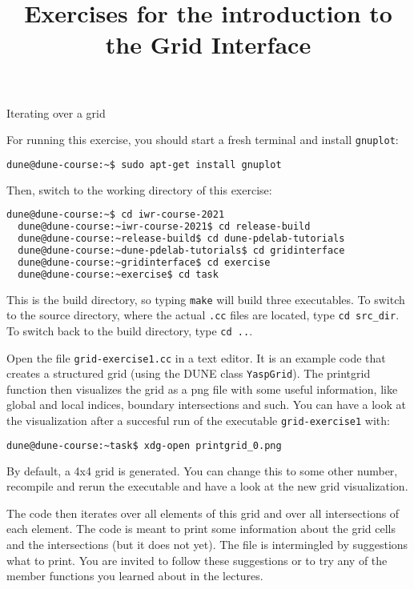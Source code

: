 \documentclass[12pt,a4paper]{article}
\title{\textbf{Exercises for the introduction to the Grid Interface}}
\begin{document}
\exerciseheader

\begin{Exercise}{Iterating over a grid}

For running this exercise, you should start a fresh terminal and install \texttt{gnuplot}:
\begin{lstlisting}[language=bash,keywordstyle=\color{blue}]
  dune@dune-course:~$ sudo apt-get install gnuplot
\end{lstlisting}

Then, switch to the working directory of this exercise:
\begin{lstlisting}[language=bash,keywordstyle=\color{blue}]
  dune@dune-course:~$ cd iwr-course-2021
  dune@dune-course:~iwr-course-2021$ cd release-build
  dune@dune-course:~release-build$ cd dune-pdelab-tutorials
  dune@dune-course:~dune-pdelab-tutorials$ cd gridinterface
  dune@dune-course:~gridinterface$ cd exercise
  dune@dune-course:~exercise$ cd task
\end{lstlisting}

This is the build directory, so typing \lstinline!make! will build three executables.
To switch to the source directory, where the actual \lstinline!.cc! files are located, type \lstinline!cd src_dir!.
To switch back to the build directory, type \lstinline!cd ..!.

Open the file \texttt{grid-exercise1.cc} in a text editor.  It is an
example code that creates a structured grid (using the DUNE class
\texttt{YaspGrid}). The printgrid function then visualizes the grid
as a png file with some useful information, like global and local
indices, boundary intersections and such. You can have a look at the
visualization after a succesful run of the executable \lstinline!grid-exercise1!
with:

\begin{lstlisting}[language=bash,keywordstyle=\color{blue}]
  dune@dune-course:~task$ xdg-open printgrid_0.png
\end{lstlisting}%

By default, a 4x4 grid is generated. You can change this to some
other number, recompile and rerun the executable and have a look at
the new grid visualization.

The code then iterates over all elements of this grid and
over all intersections of each element.  The code is meant to print
some information about the grid cells and the intersections (but it
does not yet).  The file is intermingled by suggestions what to print.
You are invited to follow these suggestions or to try any of the
member functions you learned about in the lectures.


\end{Exercise}
\end{document}
